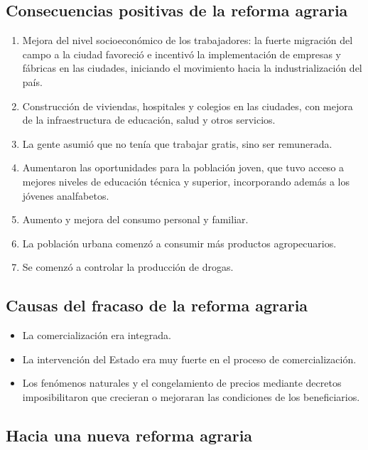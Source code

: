 \documentclass[
  man,
  floatsintext,
  longtable,
  a4paper,
  nolmodern,
  notxfonts,
  notimes,
  12pt,
  colorlinks=true,linkcolor=blue,citecolor=blue,urlcolor=blue]{apa7}
\providecommand{\tightlist}{%
  \setlength{\itemsep}{0pt}\setlength{\parskip}{0pt}}
\begin{document}
\subsection{Consecuencias positivas de la reforma
agraria}\label{consecuencias-positivas-de-la-reforma-agraria}

\begin{enumerate}
\def\labelenumi{\arabic{enumi}.}
\item
  Mejora del nivel socioeconómico de los trabajadores: la fuerte
  migración del campo a la ciudad favoreció e incentivó la
  implementación de empresas y fábricas en las ciudades, iniciando el
  movimiento hacia la industrialización del país.
\item
  Construcción de viviendas, hospitales y colegios en las ciudades, con
  mejora de la infraestructura de educación, salud y otros servicios.
\item
  La gente asumió que no tenía que trabajar gratis, sino ser remunerada.
\item
  Aumentaron las oportunidades para la población joven, que tuvo acceso
  a mejores niveles de educación técnica y superior, incorporando además
  a los jóvenes analfabetos.
\item
  Aumento y mejora del consumo personal y familiar.
\item
  La población urbana comenzó a consumir más productos agropecuarios.
\item
  Se comenzó a controlar la producción de drogas.
\end{enumerate}

\subsection{Causas del fracaso de la reforma
agraria}\label{causas-del-fracaso-de-la-reforma-agraria}

\begin{itemize}
\tightlist
\item
  La comercialización era integrada.
\item
  La intervención del Estado era muy fuerte en el proceso de
  comercialización.
\item
  Los fenómenos naturales y el congelamiento de precios mediante
  decretos imposibilitaron que crecieran o mejoraran las condiciones de
  los beneficiarios.
\end{itemize}

\subsection{Hacia una nueva reforma
agraria}\label{hacia-una-nueva-reforma-agraria}
\end{document}
